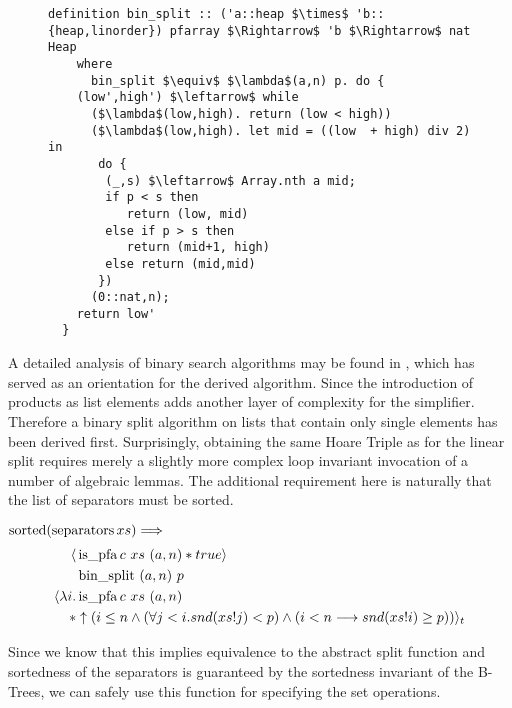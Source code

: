 \begin{figure}
\begin{lstlisting}[mathescape=true, language=Isabelle, caption={The imperative binary split},
    label={lst:imp-binary-split}]
    definition bin_split :: ('a::heap $\times$ 'b::{heap,linorder}) pfarray $\Rightarrow$ 'b $\Rightarrow$ nat Heap 
    where 
      bin_split $\equiv$ $\lambda$(a,n) p. do { 
    (low',high') $\leftarrow$ while  
      ($\lambda$(low,high). return (low < high))  
      ($\lambda$(low,high). let mid = ((low  + high) div 2) in 
       do { 
        (_,s) $\leftarrow$ Array.nth a mid; 
        if p < s then 
           return (low, mid) 
        else if p > s then 
           return (mid+1, high) 
        else return (mid,mid) 
       })  
      (0::nat,n); 
    return low' 
  }
\end{lstlisting}
\end{figure}

A detailed analysis of binary search algorithms
may be found in \parencite{DBLP:journals/csedu/Montague91},
which has served as an orientation for the derived algorithm.
Since the introduction of products as list elements
adds another layer of complexity for the simplifier.
Therefore a binary split algorithm on lists that contain
only single elements has been derived first.
Surprisingly, obtaining the same Hoare Triple
as for the linear split requires merely
a slightly more complex loop invariant
invocation of a number of algebraic lemmas.
The additional requirement here is naturally
that the list of separators must be sorted.

\begin{lemma} $\operatorname{sorted} (\operatorname{separators} xs) \Longrightarrow$ \\
    \begin{align*}
        \langle &\operatorname{is\_pfa} c\ xs\ (a,n) * true \rangle \\
                  &\operatorname{bin\_split}\ (a,n)\ p \\
        \langle \lambda i. & \operatorname{is\_pfa} c\ xs\ (a,n) \\
        * &\uparrow(i \leq n 
            \wedge (\forall j < i. snd (xs!j) < p) 
            \wedge (i<n \longrightarrow snd (xs!i) \geq p)) \rangle_t 
    \end{align*}
\end{lemma}

Since we know that this implies equivalence to the abstract split function
and sortedness of the separators is guaranteed by the sortedness
invariant of the B-Trees,
we can safely use this function for specifying
the set operations.

